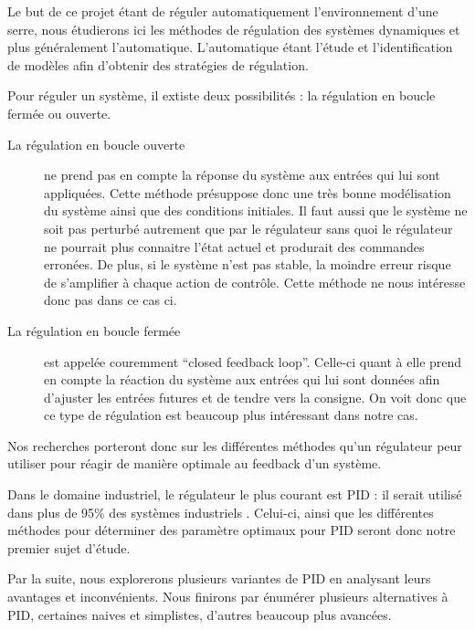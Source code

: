 
Le but de ce projet étant de réguler automatiquement l'environnement d'une serre,
nous étudierons ici les méthodes de régulation des systèmes dynamiques et plus généralement l'automatique.
L'automatique étant l'étude et l'identification de modèles afin d'obtenir des stratégies de régulation.

Pour réguler un système, il extiste deux possibilités : la régulation en boucle fermée ou ouverte.

\begin{description}
\item[La régulation en boucle ouverte] ne prend pas en compte la réponse du système aux entrées qui lui sont appliquées. Cette méthode présuppose donc une très bonne modélisation du système ainsi que des conditions initiales.
Il faut aussi que le système ne soit pas perturbé autrement que par le régulateur sans quoi le régulateur ne pourrait plus connaitre l'état actuel et produrait des commandes erronées.
De plus, si le système n'est pas stable, la moindre erreur risque de s'amplifier à chaque action de contrôle.
Cette méthode ne nous intéresse donc pas dans ce cas ci.

\item[La régulation en boucle fermée] est appelée couremment ``closed feedback loop''.
Celle-ci quant à elle prend en compte la réaction du système aux entrées qui lui sont données afin d'ajuster les entrées futures et de tendre vers la consigne.
On voit donc que ce type de régulation est beaucoup plus intéressant dans notre cas.
\end{description}

Nos recherches porteront donc sur les différentes méthodes qu'un régulateur peur utiliser pour réagir de manière optimale au feedback d'un système.


Dans le domaine industriel, le régulateur le plus courant est PID : il serait utilisé dans plus de 95\% des systèmes industriels \cite{Kinnaert2013}.
Celui-ci, ainsi que les différentes méthodes pour déterminer des paramètre optimaux pour PID seront donc notre premier sujet d'étude.

Par la suite, nous explorerons plusieurs variantes de PID en analysant leurs avantages et inconvénients.
Nous finirons par énumérer plusieurs alternatives à PID, certaines naives et simplistes, d'autres beaucoup plus avancées.
